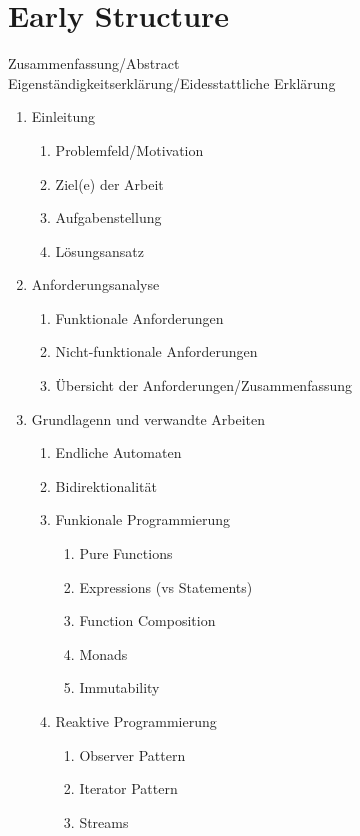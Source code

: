 \section{Early Structure}
\label{sec:early-structure}

\quad Zusammenfassung/Abstract \\
\quad Eigenständigkeitserklärung/Eidesstattliche Erklärung
\begin{enumerate}
    \item Einleitung
    \begin{enumerate}
        \item Problemfeld/Motivation
        \item Ziel(e) der Arbeit
        \item Aufgabenstellung
        \item Lösungsansatz
    \end{enumerate}
    \item Anforderungsanalyse
    \begin{enumerate}
        \item Funktionale Anforderungen
        \item Nicht-funktionale Anforderungen
        \item Übersicht der Anforderungen/Zusammenfassung
    \end{enumerate}
    \item Grundlagenn und verwandte Arbeiten
    \begin{enumerate}
        \item Endliche Automaten
        \item Bidirektionalität
        \item Funkionale Programmierung
        \begin{enumerate}
            \item Pure Functions
            \item Expressions (vs Statements)
            \item Function Composition
            \item Monads
            \item Immutability
        \end{enumerate}
        \item Reaktive Programmierung
        \begin{enumerate}
            \item Observer Pattern
            \item Iterator Pattern
            \item Streams

\end{enumerate}
\end{enumerate}
\end{enumerate}
